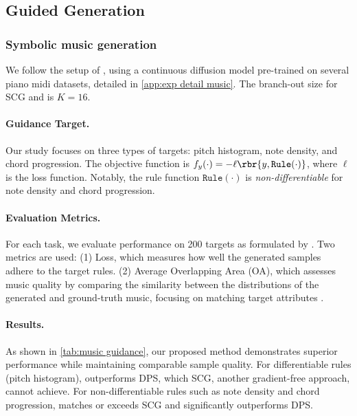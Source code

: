 \subsection{Guided Generation} \label{sec: exp guidance results}










\subsubsection{Symbolic music generation} 
We follow the setup of \citet{huang2024symbolic}, using a continuous diffusion model pre-trained on several piano midi datasets, detailed in \cref{app:exp detail music}. The branch-out size for SCG and \xcleansampling is $K=16$.
\vspace{-5pt}
\paragraph{Guidance Target.} Our study focuses on three types of targets: pitch histogram, note density, and chord progression. The objective function is $f_{y}(\cdot) = - \ell \rbr{y, \texttt{Rule}(\cdot)}$, where $\ell$ is the loss function. Notably, the rule function $\texttt{Rule}(\cdot)$ is \textit{non-differentiable} for note density and chord progression.

\paragraph{Evaluation Metrics.} For each task, we evaluate performance on 200 targets as formulated by \citet{huang2024symbolic}. Two metrics are used: (1) Loss, which measures how well the generated samples adhere to the target rules. (2) Average Overlapping Area (OA), which assesses music quality by comparing the similarity between the distributions of the generated and ground-truth music, focusing on matching target attributes \cite{yang2020evaluation}.



\paragraph{Results.} As shown in \cref{tab:music guidance}, our proposed \xcleansampling method demonstrates superior performance while maintaining comparable sample quality.  For differentiable rules (pitch histogram), \xcleansampling outperforms DPS, which SCG, another gradient-free approach, cannot achieve. For non-differentiable rules such as note density and chord progression, \xcleansampling matches or exceeds SCG and significantly outperforms DPS.


